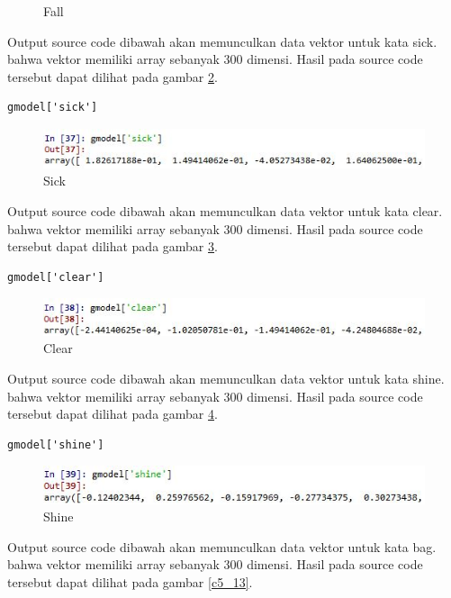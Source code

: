 \begin{enumerate}
\begin{figure}[!htbp]
	\caption{Fall}
	\label{c5_9}
\end{figure}
\subitem Output source code dibawah akan memunculkan data vektor untuk kata sick. bahwa vektor memiliki array sebanyak 300 dimensi. Hasil pada source code tersebut dapat dilihat pada gambar \ref{c5_10}.
\begin{verbatim}
gmodel['sick']
\end{verbatim}
\begin{figure}[!htbp]
	\centerline{\includegraphics[width=1\textwidth]{figures/huda/chapter5/10.JPG}}
	\caption{Sick}
	\label{c5_10}
\end{figure}
\subitem Output source code dibawah akan memunculkan data vektor untuk kata clear. bahwa vektor memiliki array sebanyak 300 dimensi. Hasil pada source code tersebut dapat dilihat pada gambar \ref{c5_11}.
\begin{verbatim}
gmodel['clear']
\end{verbatim}
\begin{figure}[!htbp]
	\centerline{\includegraphics[width=1\textwidth]{figures/huda/chapter5/11.JPG}}
	\caption{Clear}
	\label{c5_11}
\end{figure}
\subitem Output source code dibawah akan memunculkan data vektor untuk kata shine. bahwa vektor memiliki array sebanyak 300 dimensi. Hasil pada source code tersebut dapat dilihat pada gambar \ref{c5_12}.
\begin{verbatim}
gmodel['shine']
\end{verbatim}
\begin{figure}[!htbp]
	\centerline{\includegraphics[width=1\textwidth]{figures/huda/chapter5/12.JPG}}
	\caption{Shine}
	\label{c5_12}
\end{figure}
\subitem Output source code dibawah akan memunculkan data vektor untuk kata bag. bahwa vektor memiliki array sebanyak 300 dimensi. Hasil pada source code tersebut dapat dilihat pada gambar \ref{c5_13}.
\begin{verbatim}

\end{verbatim}
\end{enumerate}
